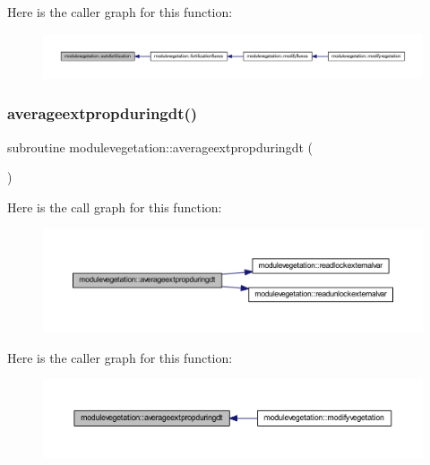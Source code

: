 Here is the caller graph for this function\+:\nopagebreak
\begin{figure}[H]
\begin{center}
\leavevmode
\includegraphics[width=350pt]{namespacemodulevegetation_a75a60d7b15cdc37b7785b839927d2153_icgraph}
\end{center}
\end{figure}
\mbox{\label{namespacemodulevegetation_a7f06e4e44dcbf158ef41eaf0b26ef491}} 
\subsubsection{\texorpdfstring{averageextpropduringdt()}{averageextpropduringdt()}}
{\footnotesize\ttfamily subroutine modulevegetation\+::averageextpropduringdt (\begin{DoxyParamCaption}{ }\end{DoxyParamCaption})\hspace{0.3cm}{\ttfamily [private]}}

Here is the call graph for this function\+:\nopagebreak
\begin{figure}[H]
\begin{center}
\leavevmode
\includegraphics[width=350pt]{namespacemodulevegetation_a7f06e4e44dcbf158ef41eaf0b26ef491_cgraph}
\end{center}
\end{figure}
Here is the caller graph for this function\+:\nopagebreak
\begin{figure}[H]
\begin{center}
\leavevmode
\includegraphics[width=350pt]{namespacemodulevegetation_a7f06e4e44dcbf158ef41eaf0b26ef491_icgraph}
\end{center}
\end{figure}
\mbox{\label{namespacemodulevegetation_a156df3425609d782754520991389dc1a}} 
